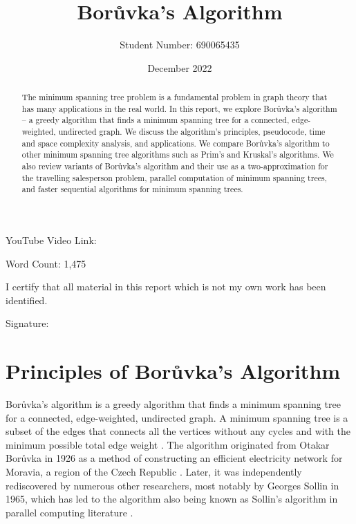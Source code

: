 \documentclass[a4paper, 11pt]{article}
\begin{document}
\title{Borůvka's Algorithm}
\author{Student Number: 690065435}
\date{December 2022}

\maketitle

\begin{abstract}
The minimum spanning tree problem is a fundamental problem in graph theory that has many applications in the real world. In this report, we explore Borůvka's algorithm -- a greedy algorithm that finds a minimum spanning tree for a connected, edge-weighted, undirected graph. We discuss the algorithm's principles, pseudocode, time and space complexity analysis, and applications. We compare Borůvka's algorithm to other minimum spanning tree algorithms such as Prim's and Kruskal's algorithms. We also review variants of Borůvka's algorithm and their use as a two-approximation for the travelling salesperson problem, parallel computation of minimum spanning trees, and faster sequential algorithms for minimum spanning trees.

\begin{center}
\end{center}
\end{abstract}

\vspace*{\fill}
\begin{center}
YouTube Video Link:

\vspace{0.5em}
Word Count: 1,475

\vspace{1em}
I certify that all material in this report which is not my own work has been identified.
\end{center}
\vspace{1em}

Signature: \hrulefill

\newpage
\section{Principles of Borůvka's Algorithm}
Borůvka's algorithm is a greedy algorithm that finds a minimum spanning tree for a connected, edge-weighted, undirected graph. A minimum spanning tree is a subset of the edges that connects all the vertices without any cycles and with the minimum possible total edge weight \cite{graham1985history}. The algorithm originated from Otakar Borůvka in 1926 as a method of constructing an efficient electricity network for Moravia, a region of the Czech Republic \cite{nevsetvril2001otakar}. Later, it was independently rediscovered by numerous other researchers, most notably by Georges Sollin in 1965, which has led to the algorithm also being known as Sollin's algorithm in parallel computing literature \cite{sollin1965trace}. 
\end{document}
